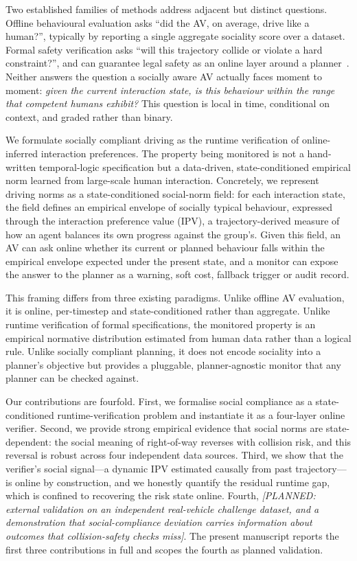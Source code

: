 \documentclass[12pt,a4paper]{article}
\newcommand{\planned}[1]{{\color{blue!60!black}\textit{[PLANNED: #1]}}}
\begin{document}
Two established families of methods address adjacent but distinct questions. Offline
behavioural evaluation asks ``did the AV, on average, drive like a human?'', typically by
reporting a single aggregate sociality score over a dataset. Formal safety verification
asks ``will this trajectory collide or violate a hard constraint?'', and can guarantee
legal safety as an online layer around a planner~\cite{pek2020online}. Neither answers the
question a socially aware AV actually faces moment to moment: \emph{given the current
interaction state, is this behaviour within the range that competent humans exhibit?} This
question is local in time, conditional on context, and graded rather than binary.

We formulate socially compliant driving as the runtime verification of
online-inferred interaction preferences. The property being monitored is not a
hand-written temporal-logic specification but a data-driven, state-conditioned
empirical norm learned from large-scale human interaction. Concretely, we represent
driving norms as a state-conditioned social-norm field: for each interaction state, the
field defines an empirical envelope of socially typical behaviour, expressed through the
interaction preference value (IPV), a trajectory-derived measure of how an agent balances
its own progress against the group's. Given this field, an AV can ask online whether its
current or planned behaviour falls within the empirical envelope expected under the present
state, and a monitor can expose the answer to the planner as a warning, soft cost,
fallback trigger or audit record.

This framing differs from three existing paradigms. Unlike offline AV evaluation, it is
online, per-timestep and state-conditioned rather than aggregate. Unlike runtime
verification of formal specifications, the monitored property is an empirical normative
distribution estimated from human data rather than a logical rule. Unlike socially
compliant planning, it does not encode sociality into a planner's objective but provides a
pluggable, planner-agnostic monitor that any planner can be checked against.

Our contributions are fourfold. First, we formalise social compliance as a state-conditioned
runtime-verification problem and instantiate it as a four-layer online verifier. Second, we
provide strong empirical evidence that social norms are state-dependent: the social meaning
of right-of-way reverses with collision risk, and this reversal is robust across four
independent data sources. Third, we show that the verifier's social signal---a dynamic IPV
estimated causally from past trajectory---is online by construction, and we honestly
quantify the residual runtime gap, which is confined to recovering the risk state online.
Fourth, \planned{external validation on an independent real-vehicle challenge dataset, and
a demonstration that social-compliance deviation carries information about outcomes that
collision-safety checks miss}. The present manuscript reports the first three contributions
in full and scopes the fourth as planned validation.
\end{document}
